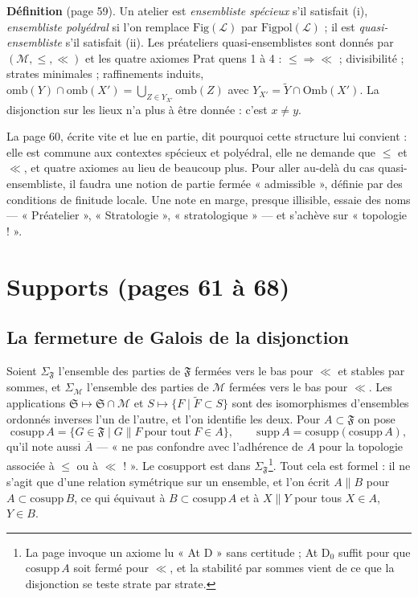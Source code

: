 \documentclass[11pt,a4paper]{article}
\begin{document}
\textbf{Définition} (page 59). Un atelier est \emph{ensembliste spécieux} s'il
satisfait (i), \emph{ensembliste polyédral} si l'on remplace
$\mathrm{Fig}(\mathcal{L})$ par $\mathrm{Figpol}(\mathcal{L})$ ; il est
\emph{quasi-ensembliste} s'il satisfait (ii). Les préateliers quasi-ensemblistes
sont donnés par $(\mathcal{M}, \leq, \ll)$ et les quatre axiomes Prat quens 1 à
4 : $\leq \Rightarrow \ll$ ; divisibilité ; strates minimales ; raffinements
induits, $\mathrm{omb}(Y) \cap \mathrm{omb}(X') = \bigcup_{Z \in Y_{X'}}
\mathrm{omb}(Z)$ avec $Y_{X'} = \widetilde{Y} \cap \mathrm{Omb}(X')$. La
disjonction sur les lieux n'a plus à être donnée : c'est $x \neq y$.

La page 60, écrite vite et lue en partie, dit pourquoi cette structure lui
convient : elle est commune aux contextes spécieux et polyédral, elle ne demande
que $\leq$ et $\ll$, et quatre axiomes au lieu de beaucoup plus. Pour aller au-delà
du cas quasi-ensembliste, il faudra une notion de partie fermée « admissible »,
définie par des conditions de finitude locale. Une note en marge, presque
illisible, essaie des noms --- « Préatelier », « Stratologie »,
« stratologique » --- et s'achève sur « topologie ! ».

\section*{Supports (pages 61 à 68)}

\subsection*{La fermeture de Galois de la disjonction}

Soient $\Sigma_{\mathfrak{F}}$ l'ensemble des parties de $\mathfrak{F}$ fermées vers
le bas pour $\ll$ et stables par sommes, et $\Sigma_{\mathcal{M}}$ l'ensemble des
parties de $\mathcal{M}$ fermées vers le bas pour $\ll$. Les applications
$\mathfrak{S} \mapsto \mathfrak{S} \cap \mathcal{M}$ et $S \mapsto \{F \mid
\widetilde{F} \subset S\}$ sont des isomorphismes d'ensembles ordonnés inverses
l'un de l'autre, et l'on identifie les deux. Pour $A \subset \mathfrak{F}$ on
pose
\[
\mathrm{cosupp}\, A = \{G \in \mathfrak{F} \mid G \parallel F \ \text{pour tout}\
F \in A\} , \qquad \mathrm{supp}\, A = \mathrm{cosupp}(\mathrm{cosupp}\, A) ,
\]
qu'il note aussi $\overline{A}$ --- « ne pas confondre avec l'adhérence de $A$ pour
la topologie associée à $\leq$ ou à $\ll$ ! ». Le cosupport est dans
$\Sigma_{\mathfrak{F}}$\footnote{La page invoque un axiome lu « At D » sans
certitude ; At D$_{0}$ suffit pour que $\mathrm{cosupp}\, A$ soit fermé pour
$\ll$, et la stabilité par sommes vient de ce que la disjonction se teste strate
par strate.}. Tout cela est formel : il ne s'agit que d'une relation symétrique
sur un ensemble, et l'on écrit $A \parallel B$ pour $A \subset \mathrm{cosupp}\,
B$, ce qui équivaut à $B \subset \mathrm{cosupp}\, A$ et à $X \parallel Y$ pour
tous $X \in A$, $Y \in B$.
\end{document}
